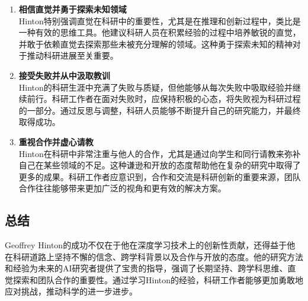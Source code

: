 \documentclass[UTF8]{homework}
\begin{document}
\begin{homeworkProblem}
\begin{enumerate}
	\item \textbf{相信直觉并勇于探索未知领域} \\
	Hinton特别强调直觉在科研中的重要性，尤其是在推理和创新过程中，类比是一种有效的思维工具。他建议科研人员在积累经验的过程中培养敏锐的直觉，并敢于依赖直觉去探索那些未被充分理解的领域。这种勇于探索未知的精神对于推动科研进展至关重要。
	
	\item \textbf{接受失败并从中汲取教训} \\
	Hinton的科研生涯中充满了失败与质疑，但他能够从每次失败中吸取经验并继续前行。科研工作者在面对失败时，应保持积极的心态，将失败视为科研过程的一部分。通过反思与调整，科研人员能够不断提升自己的研究能力，并最终取得成功。
	
	\item \textbf{重视合作并虚心请教} \\
	Hinton在科研中非常注重与他人的合作，尤其是通过向学生和同行请教来弥补自己在某些领域的不足。这种谦逊和开放的态度帮助他在复杂的研究中取得了更多的成果。科研工作者应意识到，合作和交流是科研创新的重要来源，团队合作往往能够带来更加广泛的视角和更有效的解决方案。
	
\end{enumerate}

\subsection{总结}

Geoffrey Hinton的成功不仅在于他在深度学习技术上的创新性贡献，还得益于他在科研道路上坚持不懈的信念、跨学科背景以及合作与开放的态度。他的研究方法和经验为未来的AI研究者提供了宝贵的指导，强调了长期坚持、跨学科思维、直觉探索和团队合作的重要性。通过学习Hinton的经验，科研工作者能够更加勇敢地应对挑战，推动科学的进一步进步。


\end{homeworkProblem}
\end{document}
